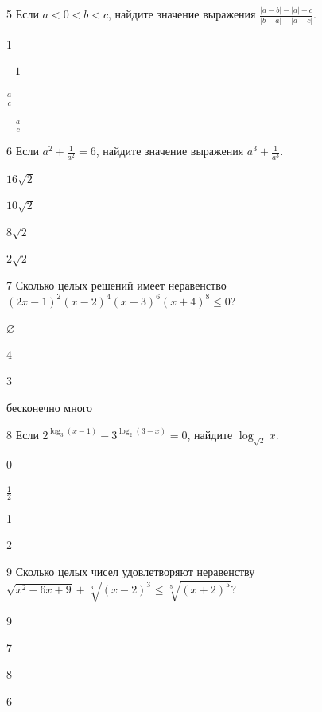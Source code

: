 \documentclass[14pt]{article}
\begin{document}
\begin{questionbox}{5}
    Если \(a < 0 < b < c\), найдите значение выражения \(\frac{|a-b| - |a| - c}{|b-a| - |a-c|}\).
    \begin{options}
        \item 1
        \item \(-1\)
        \item \(\frac{a}{c}\)
        \item \(-\frac{a}{c}\)
    \end{options}
\end{questionbox}


\begin{questionbox}{6}
    Если \(a^2 + \frac{1}{a^2} = 6\), найдите значение выражения \(a^3 + \frac{1}{a^3}\).
    \begin{options}
        \item \(16\sqrt{2}\)
        \item \(10\sqrt{2}\)
        \item \(8\sqrt{2}\)
        \item \(2\sqrt{2}\)
    \end{options}
\end{questionbox}


\begin{questionbox}{7}
    Сколько целых решений имеет неравенство \((2x-1)^2 (x-2)^4 (x+3)^6 (x+4)^8 \le 0\)?
    \begin{options}
        \item \(\varnothing\)
        \item 4
        \item 3
        \item бесконечно много
    \end{options}
\end{questionbox}


\begin{questionbox}{8}
    Если \(2^{\log_3(x-1)} - 3^{\log_2(3-x)} = 0\), найдите \(\log_{\sqrt{2}} x\).
    \begin{options}
        \item 0
        \item \(\frac{1}{2}\)
        \item 1
        \item 2
    \end{options}
\end{questionbox}


\begin{questionbox}{9}
    Сколько целых чисел удовлетворяют неравенству \(\sqrt{x^2 - 6x + 9} + \sqrt[3]{(x-2)^3} \le \sqrt[5]{(x+2)^5}\)?
    \begin{options}
        \item 9
        \item 7
        \item 8
        \item 6
    \end{options}
\end{questionbox}
\end{document}
